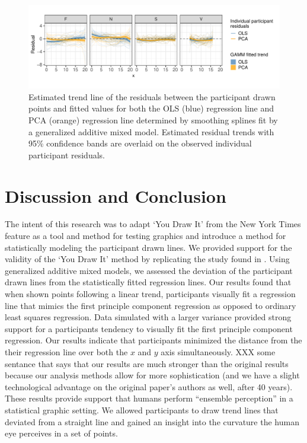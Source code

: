 \documentclass[12pt]{article}
\begin{document}
\begin{figure}[tbp]

{\centering \includegraphics[width=1\linewidth,]{Eye-Fitting-Straight-Lines-in-the-Modern-Era_files/figure-latex/eyefitting-gamm-residualplots-1} 

}

\caption{Estimated trend line of the residuals between the participant drawn points and fitted values for both the OLS (blue) regression line and PCA (orange) regression line determined by smoothing splines fit by a generalized additive mixed model. Estimated residual trends with 95\% confidence bands are overlaid on the observed individual participant residuals.}\label{fig:eyefitting-gamm-residualplots}
\end{figure}

\hypertarget{discussion-and-conclusion}{%
\section{Discussion and Conclusion}\label{discussion-and-conclusion}}

The intent of this research was to adapt `You Draw It' from the New York
Times feature as a tool and method for testing graphics and introduce a
method for statistically modeling the participant drawn lines. We
provided support for the validity of the `You Draw It' method by
replicating the study found in \citet{mosteller1981eye}. Using
generalized additive mixed models, we assessed the deviation of the
participant drawn lines from the statistically fitted regression lines.
Our results found that when shown points following a linear trend,
participants visually fit a regression line that mimics the first
principle component regression as opposed to ordinary least squares
regression. Data simulated with a larger variance provided strong
support for a participants tendency to visually fit the first principle
component regression. Our results indicate that participants minimized
the distance from the their regression line over both the \(x\) and
\(y\) axis simultaneously.
{\textcolor{RedOrange}{XXX some sentance that says that our results are much stronger than the original results because our analysis methods allow for more sophistication (and we have a slight technological advantage on the original paper's authors as well, after 40 years).}}
These results provide support that humans perform ``ensemble
perception'' in a statistical graphic setting. We allowed participants
to draw trend lines that deviated from a straight line and gained an
insight into the curvature the human eye perceives in a set of points.
\end{document}
